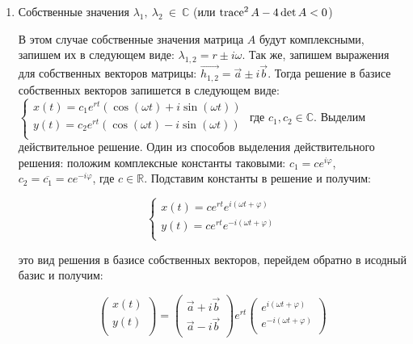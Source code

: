 \begin{enumerate}
\begin{enumerate}
  \end{enumerate}

  \item Собственные значения  $\lambda_1, ~ \lambda_2 ~ \in ~ \mathbb{C}$ (или $\operatorname{trace}^2 A - 4 \det A < 0$)

  В этом случае собственные значения матрица $A$ будут комплексными, запишем их в следующем виде:
  $\lambda_{1, 2} = r \pm i \omega$. Так же, запишем выражения для собственных векторов матрицы:
  $\vec{h_{1, 2}} = \vec{a} \pm i \vec{b}$. Тогда решение в базисе собственных векторов запишется в следующем виде:
  $\begin{cases}
    x(t) = c_1 e^{r t}(\cos (\omega t) + i \sin (\omega t)) \\
    y(t) = c_2 e^{r t}(\cos (\omega t) - i \sin (\omega t)) \\
  \end{cases}$
  где $c_1, c_2 \in \mathbb{C}$. Выделим действительное решение. Один из способов выделения действительного решения: положим комплексные константы таковыми: $c_1 = c e^{i \varphi}$, $c_2 = \overline{c_1} = c e^{-i \varphi}$, где $c \in \mathbb{R}$. Подставим константы в решение и получим:

  \begin{equation}
    \begin{cases}
      x(t) = c e^{r t} e^{i(\omega t + \varphi)} \\
      y(t) = c e^{r t} e^{-i(\omega t + \varphi)} \\
    \end{cases}
  \end{equation}

  это вид решения в базисе собственных векторов, перейдем обратно в исодный базис и получим:

  \begin{equation}
    \begin{pmatrix}
      x(t) \\
      y(t) \\
    \end{pmatrix} = 
    \begin{pmatrix}
      \vec{a} + i \vec{b} \\
      \vec{a} - i \vec{b} \\
    \end{pmatrix}
    e^{r t}
    \begin{pmatrix}
      e^{i(\omega t + \varphi)} \\
      e^{-i(\omega t + \varphi)} \\
    \end{pmatrix}
  \end{equation}


\end{enumerate}
